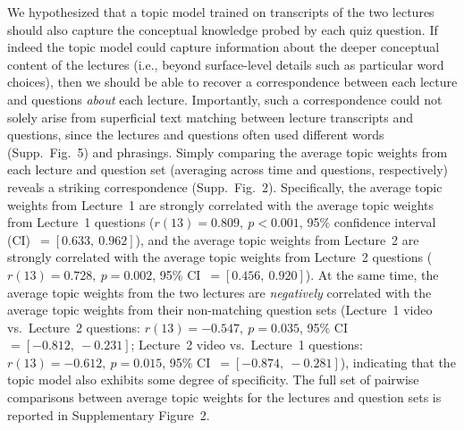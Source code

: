 \documentclass[10pt]{article}
\newcommand{\topicWeights}{2}
\newcommand{\jaccard}{5}
\begin{document}
We hypothesized that a topic model trained on transcripts of the two lectures
should also capture the conceptual knowledge probed by each quiz question. If
indeed the topic model could capture information about the deeper conceptual
content of the lectures (i.e., beyond surface-level details such as particular
word choices), then we should be able to recover a correspondence between each
lecture and questions \textit{about} each lecture. Importantly, such a
correspondence could not solely arise from superficial text matching between
lecture transcripts and questions, since the lectures and questions often used
different words (Supp.~Fig.~\jaccard) and phrasings. Simply comparing the
average topic weights from each lecture and question set (averaging across time
and questions, respectively) reveals a striking correspondence 
(Supp.~Fig.~\topicWeights). Specifically, the average topic weights from Lecture~1 are
strongly correlated with the average topic weights from Lecture~1 questions
($r(13) = 0.809,~p < 0.001$, 95\% confidence interval (CI)~$= [0.633,~0.962]$),
and the average topic weights from Lecture~2 are strongly correlated with the
average topic weights from Lecture~2 questions ($r(13) = 0.728,~p = 0.002$,
95\% CI~$= [0.456,~0.920]$). At the same time, the average topic weights from
the two lectures are \textit{negatively} correlated with the average topic weights from their non-matching
question sets (Lecture~1 video vs.~Lecture~2 questions: $r(13) = -0.547,~p =
0.035$, 95\% CI~$= [-0.812, ~-0.231]$; Lecture~2 video vs.~Lecture~1 questions:
$r(13) = -0.612,~p = 0.015$, 95\% CI~$= [-0.874,~-0.281]$), indicating that the
topic model also exhibits some degree of specificity. The full set of pairwise
comparisons between average topic weights for the lectures and question sets is
reported in Supplementary Figure~\topicWeights.
\end{document}
